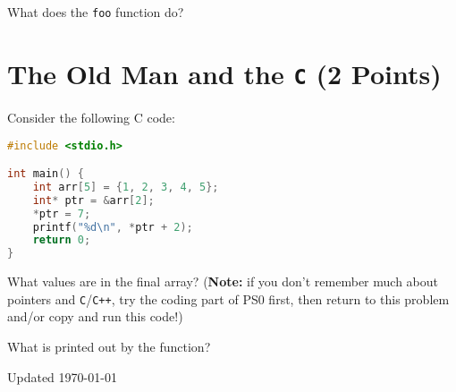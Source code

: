 \documentclass[]{article}
\begin{document}
What does the \texttt{foo} function do?
\newpage


\section{The Old Man and the \texttt{C} (2 Points)}

Consider the following C code:

\begin{tcolorbox}[left=14pt, arc=0pt, outer arc=0pt, colframe=blue!5, colback=blue!5]
\begin{lstlisting}[language=c]
#include <stdio.h>

int main() {
    int arr[5] = {1, 2, 3, 4, 5};
    int* ptr = &arr[2];
    *ptr = 7;
    printf("%d\n", *ptr + 2);
    return 0;
}
\end{lstlisting}
\end{tcolorbox}

\vspace{0.5cm}

What values are in the final array? (\textbf{Note:} if you don't remember much about pointers and \texttt{C}/\texttt{C++}, try the coding part of PS0 first, then return to this problem and/or copy and run this code!)
\vspace{3cm}

What is printed out by the function?

\vfill
\begin{tiny}Updated \today \end{tiny}
\end{document}

